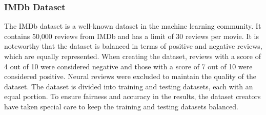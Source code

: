 \subsubsection{IMDb Dataset}

The IMDb dataset is a well-known dataset in the machine learning community. It contains 50,000 reviews from IMDb and has a limit of 30 reviews per movie\cite{maas-EtAl:2011:ACL-HLT2011}. It is noteworthy that the dataset is balanced in terms of positive and negative reviews, which are equally represented. When creating the dataset, reviews with a score of 4 out of 10 were considered negative and those with a score of 7 out of 10 were considered positive. Neural reviews were excluded to maintain the quality of the dataset. The dataset is divided into training and testing datasets, each with an equal portion. To ensure fairness and accuracy in the results, the dataset creators have taken special care to keep the training and testing datasets balanced.

